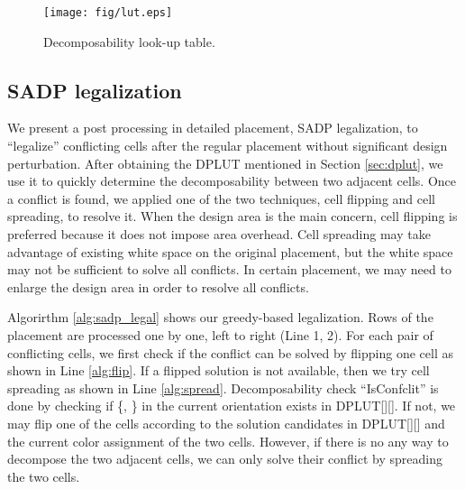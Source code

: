\begin{figure}[h]
 \centering
\texttt{[image: fig/lut.eps]}
\caption{Decomposability look-up table.}
  \label{fig:lut}
\end{figure}

\subsection{SADP legalization}
We present a post processing in detailed placement, SADP legalization, to ``legalize'' conflicting cells after the regular placement without significant design perturbation. After obtaining the DPLUT mentioned in Section \ref{sec:dplut}, we use it to quickly determine the decomposability between two adjacent cells. Once a conflict is found, we applied one of the two techniques, cell flipping and cell spreading, to resolve it. When the design area is the main concern, cell flipping is preferred because it does not impose area overhead. Cell spreading may take advantage of existing white space on the original placement, but the  white space may not be sufficient to solve all conflicts. In certain placement, we may need to enlarge the design area in order to resolve all conflicts.

Algorirthm \ref{alg:sadp_legal} shows our greedy-based legalization. Rows of the placement are processed one by one, left to right (Line 1, 2). For each pair of conflicting cells, we first check if the conflict can be solved by flipping one cell as shown in Line \ref{alg:flip}. If a flipped solution is not available, then we try cell spreading as shown in Line \ref{alg:spread}. Decomposability check ``IsConfclit'' is done by checking if \{, \} in the current orientation exists in DPLUT[][]. If not, we may flip one of the cells according to the solution candidates in DPLUT[][] and the current color assignment of the two cells. However, if there is no any way to decompose the two adjacent cells, we can only solve their conflict by spreading the two cells.

